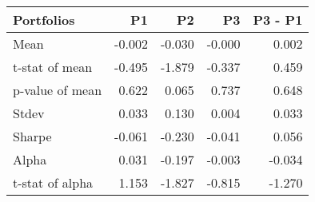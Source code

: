 \begin{tabular}{lrrrr}
\toprule
Portfolios & P1 & P2 & P3 & P3 - P1 \\
\midrule
Mean & -0.002 & -0.030 & -0.000 & 0.002 \\
t-stat of mean & -0.495 & -1.879 & -0.337 & 0.459 \\
p-value of mean & 0.622 & 0.065 & 0.737 & 0.648 \\
Stdev & 0.033 & 0.130 & 0.004 & 0.033 \\
Sharpe & -0.061 & -0.230 & -0.041 & 0.056 \\
Alpha & 0.031 & -0.197 & -0.003 & -0.034 \\
t-stat of alpha & 1.153 & -1.827 & -0.815 & -1.270 \\
\bottomrule
\end{tabular}
